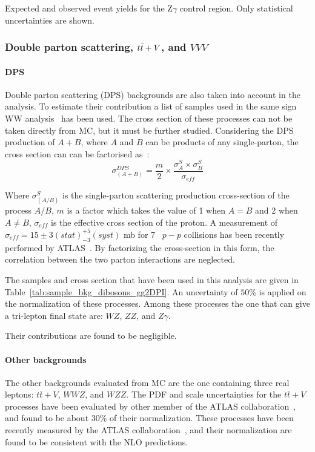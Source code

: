 \begin{table}[ht!]
\centering

\caption{Expected and observed event yields for the Z$\gamma$ control region. 
Only statistical uncertainties are shown.}
\label{tab:Zgamma_CR}
\end{table}



\subsubsection{Double parton scattering, $t\bar{t} + V$, and $VVV$}

\paragraph{DPS}
\label{sec:bkg_DPS}
Double parton scattering (DPS) backgrounds are also taken into account in the analysis. To estimate their contribution a list of samples used in the same sign WW analysis~\cite{Aad:2014zda,DPS:Twiki} has been used. The cross section of these processes can not be taken directly from MC, but it must be further studied. Considering the DPS production of $A+B$, where $A$ and $B$ can be products of any single-parton, the cross section can can be factorised as~\cite{Gaunt:2010pi}:
\begin{equation}
	\sigma^{DPS}_{(A+B)}=\frac{m}{2}\times{}\frac{\sigma^{S}_{A}\times{}\sigma^{S}_{B}}{\sigma_{eff}}
\end{equation}	

Where $\sigma^{S}_{(A/B)}$ is the single-parton scattering production cross-section of the process $A/B$, $m$ is a factor which takes the value of 1 when $A=B$ and 2 when $A\ne B$, $\sigma_{eff}$ is the effective cross section of the proton. A measurement of $\sigma_{eff} =15\pm3(stat)^{+5}_{-3}(syst)$ mb for 7~\TeV{} $p-p$ collisions has been recently performed by ATLAS~\cite{Aad:2013bjm}. By factorizing the cross-section in this form, the correlation between the two parton interactions are neglected.

The samples and cross section that have been used in this analysis are given in Table~\ref{tab:sample_bkg_dibosons_gg2DPI}. An uncertainty of $50\%$ is applied on the normalization of these processes. Among these processes the one that can give a tri-lepton final state are: $WZ$, $ZZ$, and $Z\gamma$.
	
Their contributions are found to be negligible.


\paragraph{Other backgrounds}
The other backgrounds evaluated from MC are the one containing three real leptons: $t\bar{t}+V$, $WWZ$, and $WZZ$.
The PDF and scale uncertainties for the $t\bar{t}+V$ processes have been evaluated by other member of the ATLAS collaboration~\cite{ttV:Twiki}, and found
to be about $30\%$ of their normalization. These processes have been recently measured by the ATLAS collaboration~\cite{ATLAS-CONF-2015-032}, and their normalization are found to be consistent with the NLO predictions.


